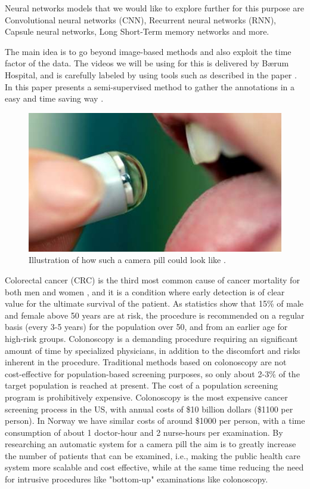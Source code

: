 \documentclass[english, a4paper]{article}
\begin{document}
Neural networks models that we would like to explore further for this purpose are Convolutional neural networks (CNN), Recurrent neural networks (RNN), Capsule neural networks, Long Short-Term memory networks and more.

The main idea is to go beyond image-based methods and also exploit the time factor of the data. 
The videos we will be using for this is delivered by Bærum Hospital, and is carefully labeled by using tools such as described in the paper . In this paper \citeauthor*{ExpertDriven15} presents a semi-supervised method to gather the annotations in a easy and time saving way \cite{ExpertDriven15}. 

\begin{figure}[H] %
  \begin{center}
    \includegraphics[width=\linewidth]{pill-cam.jpg}
    \caption{Illustration of how such a camera pill could look like \cite{PillCamCamera}.}
    \label{fig:pill-cam}
  \end{center}
\end{figure}

Colorectal cancer (CRC) is the third most common cause of cancer mortality for both men and women \cite{CancerStatistics10}, and it is a condition where early detection is of clear value for the ultimate survival of the patient. As statistics show that 15\% of male and female above 50 years are at risk, the procedure is recommended on a regular basis (every 3-5 years) for the population over 50, and from an earlier age for high-risk groups. Colonoscopy is a demanding procedure requiring an significant amount of time by specialized physicians, in addition to the discomfort and risks inherent in the procedure. Traditional methods based on colonoscopy are not cost-effective for population-based screening purposes, so only about 2-3\% of the target population is reached at present. The cost of a population screening program is prohibitively expensive. Colonoscopy is the most expensive cancer screening process in the US, with annual costs of \$10 billion dollars (\$1100 per person). In Norway we have similar costs of around \$1000 per person, with a time consumption of about 1 doctor-hour and 2 nurse-hours per examination. By researching an automatic system for a camera pill the aim is to greatly increase the number of patients that can be examined, i.e., making the public health care system more scalable and cost effective, while at the same time reducing the need for intrusive procedures like "bottom-up" examinations like colonoscopy.
\end{document}
